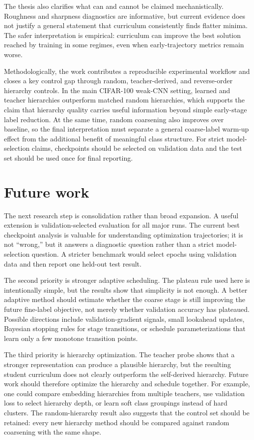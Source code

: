 \documentclass[english,master,a4paper,oneside]{ppfcmthesis}
\begin{document}
The thesis also clarifies what can and cannot be claimed mechanistically.
Roughness and sharpness diagnostics are informative, but current evidence does
not justify a general statement that curriculum consistently finds flatter
minima. The safer interpretation is empirical: curriculum can improve the best
solution reached by training in some regimes, even when early-trajectory metrics
remain worse.

Methodologically, the work contributes a reproducible experimental workflow and
closes a key control gap through random, teacher-derived, and reverse-order
hierarchy controls. In the main CIFAR-100 weak-CNN setting, learned and teacher
hierarchies outperform matched random hierarchies, which supports the claim that
hierarchy quality carries useful information beyond simple early-stage label
reduction. At the same time, random coarsening also improves over baseline, so
the final interpretation must separate a general coarse-label warm-up effect
from the additional benefit of meaningful class structure. For strict
model-selection claims, checkpoints should be selected on validation data and
the test set should be used once for final reporting.

\section{Future work}

The next research step is consolidation rather than broad expansion. A useful
extension is validation-selected evaluation for all major runs. The current best
checkpoint analysis is valuable for understanding optimization trajectories; it
is not ``wrong,'' but it answers a diagnostic question rather than a strict
model-selection question. A stricter benchmark would select epochs using
validation data and then report one held-out test result.

The second priority is stronger adaptive scheduling. The plateau rule used here
is intentionally simple, but the results show that simplicity is not enough. A
better adaptive method should estimate whether the coarse stage is still
improving the future fine-label objective, not merely whether validation
accuracy has plateaued. Possible directions include validation-gradient signals,
small lookahead updates, Bayesian stopping rules for stage transitions, or
schedule parameterizations that learn only a few monotone transition points.

The third priority is hierarchy optimization. The teacher probe shows that a
stronger representation can produce a plausible hierarchy, but the resulting
student curriculum does not clearly outperform the self-derived hierarchy. Future work
should therefore optimize the hierarchy and schedule together. For example, one
could compare embedding hierarchies from multiple teachers, use validation loss
to select hierarchy depth, or learn soft class groupings instead of hard
clusters. The random-hierarchy result also suggests that the control set should
be retained: every new hierarchy method should be compared against random
coarsening with the same shape.
\end{document}
